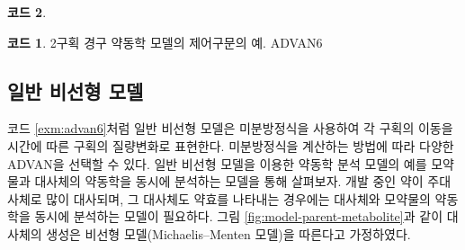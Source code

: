 \documentclass[
  10pt,
  krantz2,
  a4paper]{krantz}
\newenvironment{Shaded}{\begin{snugshade}}{\end{snugshade}}
\newcommand{\DecValTok}[1]{\textcolor[rgb]{0.00,0.00,0.81}{#1}}
\newcommand{\ErrorTok}[1]{\textcolor[rgb]{0.64,0.00,0.00}{\textbf{#1}}}
\newcommand{\KeywordTok}[1]{\textcolor[rgb]{0.13,0.29,0.53}{\textbf{#1}}}
\newcommand{\NormalTok}[1]{#1}
\newcommand{\OperatorTok}[1]{\textcolor[rgb]{0.81,0.36,0.00}{\textbf{#1}}}
\newcommand{\StringTok}[1]{\textcolor[rgb]{0.31,0.60,0.02}{#1}}
\theoremstyle{definition}
\theoremstyle{definition}
\newtheorem{example}{코드}[chapter]
\theoremstyle{definition}
\theoremstyle{remark}
\begin{document}
\begin{Shaded}
\end{Shaded}

\begin{example}
\begin{example}

\protect\hypertarget{exm:advan6}{}{\label{exm:advan6} }2구획 경구 약동학 모델의 제어구문의 예. ADVAN6

\end{example}
\end{example}

\hypertarget{uxc77cuxbc18-uxbe44uxc120uxd615-uxbaa8uxb378}{%
\subsection{일반 비선형 모델}\label{uxc77cuxbc18-uxbe44uxc120uxd615-uxbaa8uxb378}}

코드 \ref{exm:advan6}처럼 일반 비선형 모델은 미분방정식을 사용하여 각 구획의 이동을 시간에 따른 구획의 질량변화로 표현한다. 미분방정식을 계산하는 방법에 따라 다양한 ADVAN을 선택할 수 있다. 일반 비선형 모델을 이용한 약동학 분석 모델의 예를 모약물과 대사체의 약동학을 동시에 분석하는 모델을 통해 살펴보자. 개발 중인 약이 주대사체로 많이 대사되며, 그 대사체도 약효를 나타내는 경우에는 대사체와 모약물의 약동학을 동시에 분석하는 모델이 필요하다. 그림 \ref{fig:model-parent-metabolite}과 같이 대사체의 생성은 비선형 모델(Michaelis--Menten 모델)을 따른다고 가정하였다.
\end{document}
